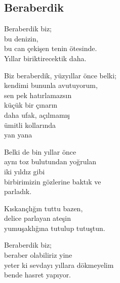 \subsection{Beraberdik}

Beraberdik biz; \\
	bu denizin, \\
		bu can çekişen tenin ötesinde. \\
Yıllar biriktirecektik daha.

\noindent\newline
Biz beraberdik, yüzyıllar önce belki; \\
kendimi bununla avutuyorum, \\
sen pek hatırlamazsın \\
küçük bir çınarın \\
	daha ufak, açılmamış \\
		ümitli kollarında \\
			yan yana

			\noindent\newline
Belki de bin yıllar önce \\
	aynı toz bulutundan yoğrulan \\
		iki yıldız gibi \\
			birbirimizin gözlerine baktık ve \\
				parladık.

				\noindent\newline
Kıskançlığın tuttu bazen, \\
delice parlayan ateşin \\
yumuşaklığına tutulup tutuştun.

\noindent\newline
Beraberdik biz; \\
beraber olabiliriz yine \\
	yeter ki sevdayı yıllara dökmeyelim \\
bende hasret yapıyor.